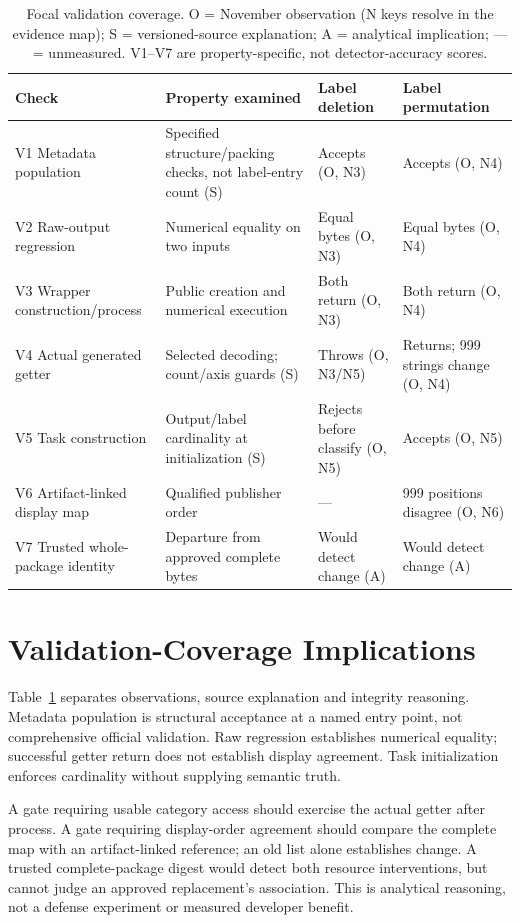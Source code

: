 \documentclass[10pt,conference]{IEEEtran}
\begin{document}
\begin{table}[t]
\caption{Focal validation coverage. O = November observation (N keys resolve in the evidence map); S = versioned-source explanation; A = analytical implication; --- = unmeasured. V1--V7 are property-specific, not detector-accuracy scores.}
\label{tab:coverage}
\centering\small
\begin{tabularx}{\textwidth}{@{}p{}p{}XX@{}}
\toprule
Check & Property examined & Label deletion & Label permutation\\
\midrule
V1 Metadata population & Specified structure/packing checks, not label-entry count (S) & Accepts (O, N3) & Accepts (O, N4)\\
V2 Raw-output regression & Numerical equality on two inputs & Equal bytes (O, N3) & Equal bytes (O, N4)\\
V3 Wrapper construction/process & Public creation and numerical execution & Both return (O, N3) & Both return (O, N4)\\
V4 Actual generated getter & Selected decoding; count/axis guards (S) & Throws (O, N3/N5) & Returns; 999 strings change (O, N4)\\
V5 Task construction & Output/label cardinality at initialization (S) & Rejects before classify (O, N5) & Accepts (O, N5)\\
V6 Artifact-linked display map & Qualified publisher order & --- & 999 positions disagree (O, N6)\\
V7 Trusted whole-package identity & Departure from approved complete bytes & Would detect change (A) & Would detect change (A)\\
\bottomrule
\end{tabularx}
\end{table}

\section{Validation-Coverage Implications}
\label{sec:discussion}
Table~\ref{tab:coverage} separates observations, source explanation and integrity reasoning. Metadata population is structural acceptance at a named entry point, not comprehensive official validation. Raw regression establishes numerical equality; successful getter return does not establish display agreement. Task initialization enforces cardinality without supplying semantic truth.

A gate requiring usable category access should exercise the actual getter after process. A gate requiring display-order agreement should compare the complete map with an artifact-linked reference; an old list alone establishes change. A trusted complete-package digest would detect both resource interventions, but cannot judge an approved replacement's association. This is analytical reasoning, not a defense experiment or measured developer benefit.
\end{document}
